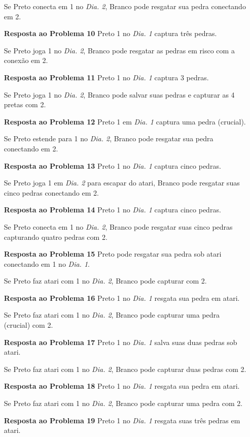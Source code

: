 \begin{itemize}
      Se Preto conecta em 1 no \emph{Dia. 2}, Branco pode resgatar sua pedra conectando em 2.
  \item[\textbf{Resposta ao Problema 10}]
      Preto 1 no \emph{Dia. 1} captura três pedras.

      Se Preto joga 1 no \emph{Dia. 2}, Branco pode resgatar as pedras em risco com a conexão em 2.
  \item[\textbf{Resposta ao Problema 11}]
      Preto 1 no \emph{Dia. 1} captura 3 pedras.

      Se Preto joga 1 no \emph{Dia. 2}, Branco pode salvar suas pedras e capturar as 4 pretas com 2.
  \item[\textbf{Resposta ao Problema 12}]
      Preto 1 em \emph{Dia. 1} captura uma pedra (crucial).

      Se Preto estende para 1 no \emph{Dia. 2}, Branco pode resgatar sua pedra conectando em 2.
  \item[\textbf{Resposta ao Problema 13}]
      Preto 1 no \emph{Dia. 1} captura cinco pedras.

      Se Preto joga 1 em \emph{Dia. 2} para escapar do atari, Branco pode resgatar suas cinco pedras conectando em 2.
  \item[\textbf{Resposta ao Problema 14}]
      Preto 1 no \emph{Dia. 1} captura cinco pedras.

      Se Preto conecta em 1 no \emph{Dia. 2}, Branco pode resgatar suas cinco pedras capturando quatro pedras com 2.
  \item[\textbf{Resposta ao Problema 15}]
      Preto pode resgatar sua pedra sob atari conectando em 1 no \emph{Dia. 1}.
      
      Se Preto faz atari com 1 no \emph{Dia. 2}, Branco pode capturar com 2.
  \item[\textbf{Resposta ao Problema 16}]
      Preto 1 no \emph{Dia. 1} resgata sua pedra em atari.

      Se Preto faz atari com 1 no \emph{Dia. 2}, Branco pode capturar uma pedra (crucial) com 2.
  \item[\textbf{Resposta ao Problema 17}]
      Preto 1 no \emph{Dia. 1} salva suas duas pedras sob atari.

      Se Preto faz atari com 1 no \emph{Dia. 2}, Branco pode capturar duas pedras com 2.
  \item[\textbf{Resposta ao Problema 18}]
      Preto 1 no \emph{Dia. 1} resgata sua pedra em atari.

      Se Preto faz atari com 1 no \emph{Dia. 2}, Branco pode capturar uma pedra com 2.
  \item[\textbf{Resposta ao Problema 19}]
      Preto 1 no \emph{Dia. 1} resgata suas três pedras em atari.


\end{itemize}
